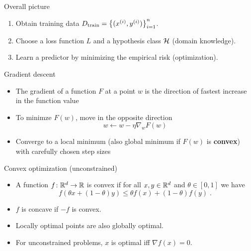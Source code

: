 \documentclass[usenames,dvipsnames,notes,11pt,aspectratio=169]{beamer}
\begin{document}
\begin{frame}
    {Overall picture}
    \begin{enumerate}
        \itemsep2em
        \item Obtain training data $D_{\text{train}}=\left\{ (x^{(i)}, y^{(i)}) \right\}_{i=1}^n$.
        \item Choose a loss function $L$ and a hypothesis class $\mathcal{H}$ (domain knowledge).
        \item Learn a predictor by minimizing the empirical risk (optimization).
    \end{enumerate}
\end{frame}

\begin{frame}
    {Gradient descent}
    \begin{itemize}
        \item The gradient of a function $F$ at a point $w$ is the direction of fastest increase in the function value
        \item To minimze $F(w)$, move in the opposite direction
        $$w \leftarrow w - \eta\nabla_w F(w)$$
        \item Converge to a local minimum (also global minimum if $F(w)$ is \textbf{convex}) with carefully chosen step sizes
    \end{itemize}
    \vspace{9em}
\end{frame}

\begin{frame}
    {Convex optimization (unconstrained)}
    \begin{itemize}
        \item A function $f\colon \mathbb{R}^d \rightarrow \mathbb{R}$ is convex if for all $x,y \in \mathbb{R}^d$ and $\theta \in [0,1]$ we have
            $$
            f(\theta x + (1-\theta)y) \le \theta f(x) + (1-\theta) f(y)  \;.
            $$
        \vspace{6em}
        \item $f$ is concave if $-f$ is convex.\\
        \item Locally optimal points are also globally optimal.
        \item For unconstrained problems, $x$ is optimal iff $\nabla f(x) = 0$.
    \end{itemize}
\end{frame}
\end{document}
